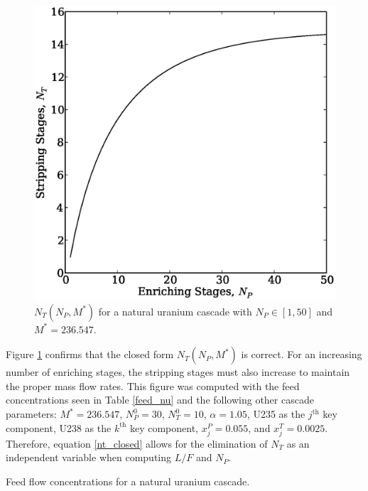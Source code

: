 \documentclass[preprint,12pt]{elsarticle}
\newcommand{\nuc}[2]{{#1}{#2}}
\newcommand{\jth}[0]{$j^{\mbox{th}}$ }
\newcommand{\kth}[0]{$k^{\mbox{th}}$ }
\begin{document}
\begin{figure}[htpb]
\begin{center}
\includegraphics[scale=0.5]{nt_closed.eps}
\caption{$N_T(N_P, M^*)$ for a natural uranium cascade with $N_P\in[1,50]$ and 
    $M^*=236.547$.}
\label{nt_closed_fig}
\end{center}
\end{figure}

Figure \ref{nt_closed_fig} confirms that the closed form $N_T(N_P, M^*)$ is correct.
For an increasing number of enriching stages, the stripping stages must also 
increase to maintain the proper mass flow rates.
This figure was computed 
with the feed concentrations seen in Table \ref{feed_nu} and the following other 
cascade parameters: $M^*=236.547$, $N_P^0=30$, $N_T^0=10$, $\alpha=1.05$, 
\nuc{U}{235} as the \jth key component, \nuc{U}{238} as the \kth key component, 
$x_j^P=0.055$, and $x_j^T=0.0025$.
Therefore, equation \ref{nt_closed} allows for the elimination of $N_T$ as an 
independent variable when computing $L/F$ and $N_P$.  

\begin{table}[htbp]
\begin{center}
\caption{Feed flow concentrations for a natural uranium cascade.}

\end{center}
\label{feed_nu}
\end{table}
\end{document}
